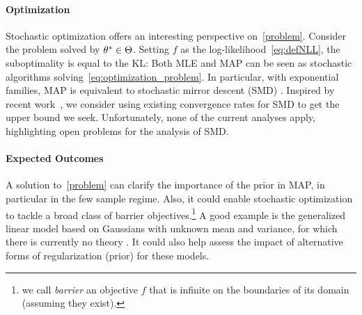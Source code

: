 \paragraph{Optimization} 
Stochastic optimization offers an interesting perspective on~\eqref{problem}.
Consider the problem
solved by $\theta^*\in \Theta$.
Setting $f$ as the log-likelihood~\eqref{eq:defNLL}, the suboptimality is equal to the KL:
Both MLE and MAP can be seen as stochastic algorithms solving~\eqref{eq:optimization_problem}.
In particular, with exponential families, MAP is equivalent to stochastic mirror descent (SMD) \citep{nemirovski2009robust}.
Inspired by recent work~\citep{lepriol2021analysis, kunstner2020homeomorphic}, we consider using existing convergence rates for SMD to get the upper bound we seek.
Unfortunately, none of the current analyses apply, highlighting open problems for the analysis of SMD.

\paragraph{Expected Outcomes}
A solution to~\eqref{problem} can clarify the importance of the prior in MAP, in particular in the few sample regime. %
Also, it could enable stochastic optimization to tackle a broad class of barrier objectives.\footnote{we call \emph{barrier} an objective $f$ that is infinite on the boundaries of its domain (assuming they exist).}
A good example is the generalized linear model based on Gaussians with unknown mean and variance, for which there is currently no theory \citep{bach2013nonstronglyconvex}.
It could also help assess the impact of alternative forms of regularization (prior) for these models.

